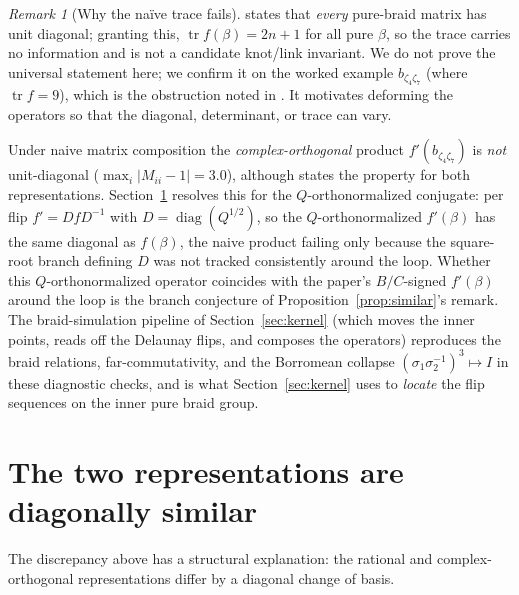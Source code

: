 \documentclass[11pt]{article}
\theoremstyle{plain}
\theoremstyle{definition}
\theoremstyle{remark}
\newtheorem{remark}[theorem]{Remark}
\begin{document}
\begin{remark}[Why the na\"ive trace fails]
\cite{rohozhkin2026} states that \emph{every} pure-braid matrix has unit diagonal; granting this,
$\operatorname{tr} f(\beta)=2n+1$ for all pure $\beta$, so the trace carries no information and is
not a candidate knot/link invariant. We do not prove the universal statement here; we confirm it on
the worked example $b_{\zeta_4\zeta_7}$ (where $\operatorname{tr} f=9$), which is the obstruction
noted in \cite{rohozhkin2026}.
It motivates deforming the operators so that the diagonal, determinant, or trace can vary.
\end{remark}

Under naive matrix composition the \emph{complex-orthogonal} product $f'(b_{\zeta_4\zeta_7})$ is
\emph{not} unit-diagonal ($\max_i|M_{ii}-1|=3.0$), although \cite{rohozhkin2026} states the property
for both representations. Section~\ref{sec:similar} resolves this for the $Q$-orthonormalized
conjugate: per flip $f'=DfD^{-1}$ with $D=\operatorname{diag}(Q^{1/2})$, so the $Q$-orthonormalized
$f'(\beta)$ has the same diagonal as $f(\beta)$, the naive product failing only because the square-root
branch defining $D$ was not tracked consistently around the loop. Whether this $Q$-orthonormalized
operator coincides with the paper's $B/C$-signed $f'(\beta)$ around the loop is the branch conjecture of
Proposition~\ref{prop:similar}'s remark. The braid-simulation pipeline of Section~\ref{sec:kernel} (which moves the inner points, reads off
the Delaunay flips, and composes the operators) reproduces the braid relations, far-commutativity,
and the Borromean collapse $(\sigma_1\sigma_2^{-1})^3\mapsto I$ in these diagnostic checks, and is what
Section~\ref{sec:kernel} uses to \emph{locate} the flip sequences on the inner pure braid group.

\section{The two representations are diagonally similar}\label{sec:similar}
The discrepancy above has a structural explanation: the rational and complex-orthogonal representations
differ by a diagonal change of basis.
\end{document}
